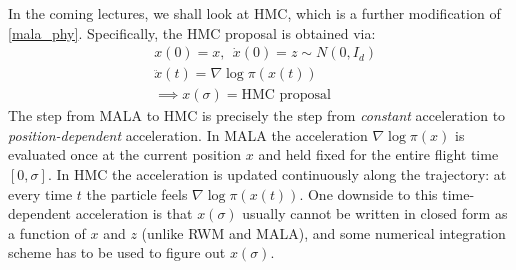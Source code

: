 \documentclass{scrartcl}
\begin{document}
In the coming lectures, we shall look at HMC, which is a further
modification of \eqref{mala_phy}. Specifically, the HMC proposal is
obtained via:
\begin{equation}\label{hmc_phy}
  \begin{split}
  &  x(0) = x, ~~ \dot{x}(0) = z \sim N(0, I_d) \\
  & \ddot{x}(t) = \nabla \log \pi(x(t)) \\
  & \implies x(\sigma) = \text{HMC proposal}
  \end{split}  
\end{equation}
The step from MALA to HMC is precisely the step from \emph{constant}
acceleration to \emph{position-dependent} acceleration. In MALA the
acceleration $\nabla\log\pi(x)$ is evaluated once at the current position $x$
and held fixed for the entire flight time $[0,\sigma]$. In HMC the
acceleration is updated continuously along the trajectory: at every time $t$
the particle feels $\nabla\log\pi(x(t))$. One downside to this
time-dependent acceleration is that $x(\sigma)$ usually cannot be
written in closed form as a function of $x$ and $z$ (unlike RWM and
MALA), and some numerical integration scheme has to be used to figure
out $x(\sigma)$. 












  



  
\end{document}
